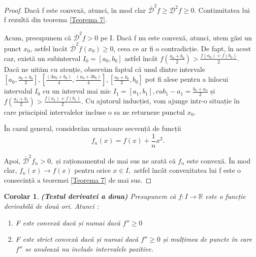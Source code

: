 \documentclass[a4paper,12pt,oneside]{report}
\newtheorem{corollary}{Corolar}
\begin{document}
\begin{proof}
Dacă f este convexă, atunci, în mod clar \(\overline{ \mathcal{D}}^{2}f\geq \underline{\mathcal{D}}^{2}f\geq 0.\) Continuitatea lui f rezultă din teorema \ref{Teorema 7}. 

Acum, presupunem că \(\overline{ \mathcal{D}}^{2}f > 0\) pe I. Dacă f nu este convexă, atunci, utem găsi un punct \(x_{0}\), astfel încât \(\overline{ \mathcal{D}}^{2}f \left ( x_{0} \right )\geq 0\), ceea ce ar fi o contradicție. De fapt, în acest caz, există un subinterval \(I_{0} = \left [ a_{0}, b_{0} \right ]\) astfel încât \(f\left ( \frac{a_{0} + b_{0}}{2} \right )> \frac{f\left ( a_{0} \right ) + f\left ( b_{0} \right )}{2}.\) Dacă ne uităm cu atenție, observăm faptul că unul dintre intervale \(\left [ a_{0}, \frac{a_{0}+b_{0}}{2} \right ], \left [ \frac{\left ( 3a_{0}+b_{0} \right )}{4},\frac{\left ( a_{0}+3b_{0} \right )}{4} \right ],\left [\frac{a_{0}+b_{0}}{2}, b_{0} \right ]\) pot fi alese pentru a înlocui intervalul \(I_{0}\) cu un interval mai mic \(I_{1}= \left [ a_{1}, b_{1} \right ], cu  b_{1} -  a_{1}= \frac{b_{0}+ a_{0}}{2}\) și \(f\left ( \frac{a_{1}+b_{1}}{2} \right ) > \frac{f\left ( a_{1} \right ) + f\left ( b_{1} \right )}{2}.\) Cu ajutorul inducției, vom ajunge intr-o situație în care principiul intervalelor incluse o sa ne returneze punctul \(x_{0}.\)

În cazul general, considerăm urmatoare secvență de funcții 
\begin{displaymath}
   f_{n}\left ( x \right ) = f\left ( x \right ) + \frac{1}{n}x^{2}.
\end{displaymath}

Apoi, \(\overline{ \mathcal{D}}^{2}f _{n} > 0,\) și raționamentul de mai sus ne arată că \(f _{n}\) este convexă. În mod clar, \(f _{n}\left ( x \right ) \rightarrow f\left ( x \right )\) pentru orice \(x \in I,\) astfel încât convexitatea lui f este o consecință a teoremei \ref{Teorema 7} de mai sus. 
\end{proof}
 \begin{corollary} \textbf{(Testul derivatei a doua)}
	Presupunem că \(f : I \rightarrow \mathbb{R}\) este o funcție derivabilă de două ori. Atunci :
\begin{enumerate}
    \item	F este convexă dacă și numai dacă \({f}''\geq 0\)
    \item  F este strict convexă dacă și numai dacă \({f}''\geq 0\) și mulțimea de puncte în care \({f}''\) se anulează nu include intervalele pozitive. 
\end{enumerate}
 \end{corollary}
\end{document}
